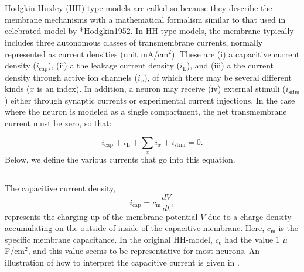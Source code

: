 \section{}
\label{sec:Neuron:membranecurrents}
Hodgkin-Huxley (HH) type models are called so because they describe the membrane mechanisms with a mathematical formalism similar to that used in celebrated model by \citeasnoun**{Hodgkin1952}. In HH-type models, the membrane typically includes three autonomous classes of transmembrane currents, normally represented as current densities (unit mA/cm$^2$). These are (i) a capacitive current density ($i_{\mathrm{cap}}$), (ii) a the leakage current density ($i_{\mathrm{L}}$), and (iii) a the current density through active ion channels ($i_x$), of which there may be several different kinds ($x$ is an index). 
In addition, a neuron may receive (iv) external stimuli ($i_{\mathrm{stim}}$) either through synaptic currents or experimental current injections. In the case where the neuron is modeled as a single compartment, the net transmembrane current must be zero, so that:

\begin{equation}
i_{\mathrm{cap}}+ i_{\mathrm{L}} + \sum_x{i_x} +  i_{\mathrm{stim}} = 0.
\label{eq:Neuron:singlecomp_zerosum}
\end{equation}
Below, we define the various currents that go into this equation.


\subsection{}
\label{sec:Neuron:Cap}

The capacitive current density,
\begin{equation}
i_{\mathrm{cap}}= c_{\mathrm{m}} \frac{dV}{dt},
\label{eq:Neuron:HHcap}
\end{equation}
represents the charging up of the membrane potential $V$ due to a charge density accumulating on the outside of inside of the capacitive membrane. Here, $c_{\mathrm{m}}$ is the specific membrane capacitance. In the original HH-model, $c_{\mathrm{c}}$ had the value 1 $\mu$F/cm$^2$, and this value seems to be representative for most neurons.  An illustration of how to interpret the capacitive current is given in . 


